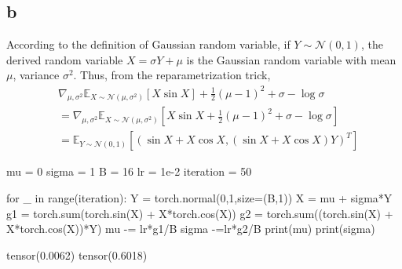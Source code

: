 \documentclass[10pt]{article}
\begin{document}
\subsection*{b}
According to the definition of Gaussian random variable, if $Y\sim \mathcal{N}(0,1)$, the derived random variable $X = \sigma Y + \mu$ is the Gaussian random variable with mean $\mu$, variance $\sigma^2$. Thus, from the reparametrization trick, 
\begin{align*}
    &\nabla_{\mu, \sigma^2} \mathbb{E}_{X\sim \mathcal{N}(\mu, \sigma^2)}\left[X \sin X\right] + \frac{1}{2}(\mu - 1)^2 + \sigma - \log \sigma \\
    &= \nabla_{\mu, \sigma^2} \mathbb{E}_{X\sim \mathcal{N}(\mu, \sigma^2)}\left[X \sin X + \frac{1}{2}(\mu - 1)^2 + \sigma - \log \sigma\right] \\  
    &= \mathbb{E}_{Y\sim \mathcal{N}(0,1)}\left[\left(\sin X + X\cos X, (\sin X + X\cos X) Y\right)^T\right]
\end{align*}
\begin{python}
mu = 0
sigma = 1
B = 16
lr = 1e-2
iteration = 50

for _ in range(iteration):
    Y = torch.normal(0,1,size=(B,1))
    X = mu + sigma*Y
    g1 = torch.sum(torch.sin(X) + X*torch.cos(X))
    g2 = torch.sum((torch.sin(X) + X*torch.cos(X))*Y)
    mu -= lr*g1/B
    sigma -=lr*g2/B
print(mu)
print(sigma)
\end{python}
\begin{python}
tensor(0.0062)
tensor(0.6018)
\end{python}
\end{document}

